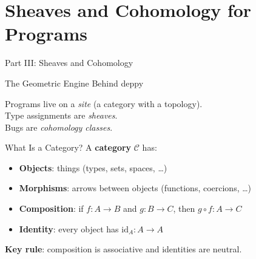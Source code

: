 \documentclass[aspectratio=169,11pt]{beamer}
\begin{document}
\part{Sheaves and Cohomology for Programs}

\begin{frame}{Part III: Sheaves and Cohomology}
\begin{center}
{\Large\color{blue} The Geometric Engine Behind deppy}

\vspace{1em}
Programs live on a \emph{site} (a category with a topology).\\
Type assignments are \emph{sheaves}.\\
Bugs are \emph{cohomology classes}.
\end{center}
\end{frame}

\begin{frame}{What Is a Category?}
A \textbf{category} $\mathcal{C}$ has:
\begin{itemize}
\item \textbf{Objects}: things (types, sets, spaces, \ldots)
\item \textbf{Morphisms}: arrows between objects (functions, coercions, \ldots)
\item \textbf{Composition}: if $f: A \to B$ and $g: B \to C$, then $g \circ f: A \to C$
\item \textbf{Identity}: every object has $\mathrm{id}_A : A \to A$
\end{itemize}

\vspace{0.5em}
\textbf{Key rule}: composition is associative and identities are neutral.

\vspace{0.5em}
\begin{center}
\end{center}
\end{frame}
\end{document}
